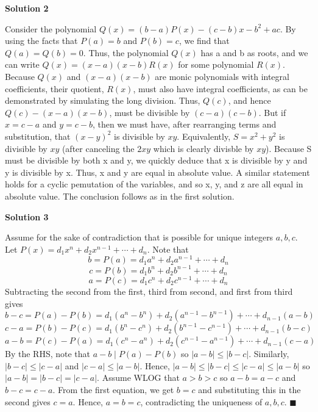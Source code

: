 \begin{enumerate}
 



\textbf{Solution 2}

Consider the polynomial $Q(x) = (b-a)P(x) - (c-b)x - b^2 + ac.$ By using the facts that $P(a) = b$ and $P(b) = c$, we find that $Q(a) = Q(b) = 0.$ Thus, the polynomial $Q(x)$ has a and b as roots, and we can write $Q(x) = (x-a)(x-b)R(x)$ for some polynomial $R(x)$. Because $Q(x)$ and $(x-a)(x-b)$ are monic polynomials with integral coefficients, their quotient, $R(x)$, must also have integral coefficients, as can be demonstrated by simulating the long division. Thus, $Q(c)$, and hence $Q(c) - (x-a)(x-b)$, must be divisible by $(c-a)(c-b)$. But if $x=c-a$ and $y=c-b$, then we must have, after rearranging terms and substitution, that $(x-y)^2$ is divisible by $xy$. Equivalently, $S = x^2 + y^2$ is divisible by $xy$ (after canceling the $2xy$ which is clearly divisble by $xy$). Because S must be divisible by both x and y, we quickly deduce that x is divisible by y and y is divisible by x. Thus, x and y are equal in absolute value. A similar statement holds for a cyclic pemutation of the variables, and so x, y, and z are all equal in absolute value. The conclusion follows as in the first solution.

 



\textbf{Solution 3}

Assume for the sake of contradiction that is possible for unique integers $a,b,c$. Let $P(x)=d_1x^n+d_2x^{n-1}+\cdots+d_n.$ Note that  
 \[b=P(a)=d_1a^n+d_2a^{n-1}+\cdots+d_n\]
 \[c=P(b)=d_1b^n+d_2b^{n-1}+\cdots+d_n\]
 \[a=P(c)=d_1c^n+d_2c^{n-1}+\cdots+d_n\]Subtracting the second from the first, third from second, and first from third gives 
 \[b-c=P(a)-P(b)=d_1(a^n-b^n)+d_2(a^{n-1}-b^{n-1})+\cdots+ d_{n-1}(a-b)\]
 \[c-a=P(b)-P(c)=d_1(b^n-c^n)+d_2(b^{n-1}-c^{n-1})+\cdots +d_{n-1}(b-c)\]
 \[a-b=P(c)-P(a)=d_1(c^n-a^n)+d_2(c^{n-1}-a^{n-1})+\cdots +d_{n-1}(c-a)\] By the RHS, note that $a-b\mid P(a)-P(b)$ so $\lvert{a-b}\rvert\leq\lvert{b-c}\rvert.$  Similarly, $\lvert{b-c}\rvert\leq\lvert{c-a}\rvert$ and $\lvert{c-a}\rvert\leq\lvert{a-b}\rvert.$  Hence, $\lvert{a-b}\rvert\leq\lvert{b-c}\rvert\leq\lvert{c-a}\rvert\leq\lvert{a-b}\rvert$ so $\lvert{a-b}\rvert=\lvert{b-c}\rvert=\lvert{c-a}\rvert.$  Assume WLOG that $a>b>c$ so $a-b=a-c$ and $b-c=c-a.$  From the first equation, we get $b=c$ and substituting this in the second gives $c=a.$  Hence, $a=b=c$, contradicting the uniqueness of $a,b,c.$ $\blacksquare$





\end{enumerate}
